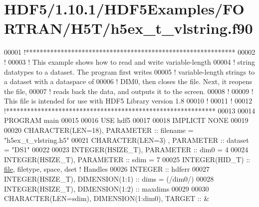 \hypertarget{_h_d_f5_21_810_81_2_h_d_f5_examples_2_f_o_r_t_r_a_n_2_h5_t_2h5ex__t__vlstring_8f90_source}{}\section{H\+D\+F5/1.10.1/\+H\+D\+F5\+Examples/\+F\+O\+R\+T\+R\+A\+N/\+H5\+T/h5ex\+\_\+t\+\_\+vlstring.f90}
\label{_h_d_f5_21_810_81_2_h_d_f5_examples_2_f_o_r_t_r_a_n_2_h5_t_2h5ex__t__vlstring_8f90_source}

\begin{DoxyCode}
00001 \textcolor{comment}{!************************************************************}
00002 \textcolor{comment}{!}
00003 \textcolor{comment}{!  This example shows how to read and write variable-length}
00004 \textcolor{comment}{!  string datatypes to a dataset.  The program first writes}
00005 \textcolor{comment}{!  variable-length strings to a dataset with a dataspace of}
00006 \textcolor{comment}{!  DIM0, then closes the file.  Next, it reopens the file,}
00007 \textcolor{comment}{!  reads back the data, and outputs it to the screen.}
00008 \textcolor{comment}{!}
00009 \textcolor{comment}{!  This file is intended for use with HDF5 Library version 1.8}
00010 \textcolor{comment}{!}
00011 \textcolor{comment}{!}
00012 \textcolor{comment}{!************************************************************}
00013 
00014 \textcolor{keyword}{PROGRAM} main
00015 
00016   \textcolor{keywordtype}{USE }hdf5
00017   
00018   \textcolor{keywordtype}{IMPLICIT NONE}
00019 
00020   \textcolor{keywordtype}{CHARACTER(LEN=18)}, \textcolor{keywordtype}{PARAMETER} :: filename  = \textcolor{stringliteral}{"h5ex\_t\_vlstring.h5"}
00021   \textcolor{keywordtype}{CHARACTER(LEN=3)} , \textcolor{keywordtype}{PARAMETER} :: dataset   = \textcolor{stringliteral}{"DS1"}
00022 
00023   \textcolor{keywordtype}{INTEGER(HSIZE\_T)}, \textcolor{keywordtype}{PARAMETER} :: dim0      = 4
00024   \textcolor{keywordtype}{INTEGER(HSIZE\_T)}, \textcolor{keywordtype}{PARAMETER} :: sdim      = 7
00025   \textcolor{keywordtype}{INTEGER(HID\_T)}  :: \hyperlink{structfile}{file}, filetype, space, dset \textcolor{comment}{! Handles}
00026   \textcolor{keywordtype}{INTEGER} :: hdferr
00027   \textcolor{keywordtype}{INTEGER(HSIZE\_T)}, \textcolor{keywordtype}{DIMENSION(1:1)} :: dims = (/dim0/)
00028   \textcolor{keywordtype}{INTEGER(HSIZE\_T)}, \textcolor{keywordtype}{DIMENSION(1:2)} :: maxdims
00029   
00030   \textcolor{keywordtype}{CHARACTER(LEN=sdim)}, \textcolor{keywordtype}{DIMENSION(1:dim0)}, \textcolor{keywordtype}{TARGET} :: &

\end{DoxyCode}
